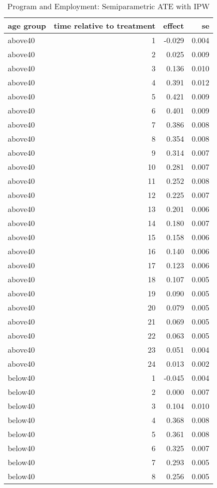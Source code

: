 \begin{table}[!h]
\centering
\caption{Program and Employment: Semiparametric ATE with IPW}
\centering
\begin{tabular}[t]{lrrr}
\toprule
age group & time relative to treatment & effect & se\\
\midrule
above40 & 1 & -0.029 & 0.004\\
above40 & 2 & 0.025 & 0.009\\
above40 & 3 & 0.136 & 0.010\\
above40 & 4 & 0.391 & 0.012\\
above40 & 5 & 0.421 & 0.009\\
\addlinespace
above40 & 6 & 0.401 & 0.009\\
above40 & 7 & 0.386 & 0.008\\
above40 & 8 & 0.354 & 0.008\\
above40 & 9 & 0.314 & 0.007\\
above40 & 10 & 0.281 & 0.007\\
\addlinespace
above40 & 11 & 0.252 & 0.008\\
above40 & 12 & 0.225 & 0.007\\
above40 & 13 & 0.201 & 0.006\\
above40 & 14 & 0.180 & 0.007\\
above40 & 15 & 0.158 & 0.006\\
\addlinespace
above40 & 16 & 0.140 & 0.006\\
above40 & 17 & 0.123 & 0.006\\
above40 & 18 & 0.107 & 0.005\\
above40 & 19 & 0.090 & 0.005\\
above40 & 20 & 0.079 & 0.005\\
\addlinespace
above40 & 21 & 0.069 & 0.005\\
above40 & 22 & 0.063 & 0.005\\
above40 & 23 & 0.051 & 0.004\\
above40 & 24 & 0.013 & 0.002\\
below40 & 1 & -0.045 & 0.004\\
\addlinespace
below40 & 2 & 0.000 & 0.007\\
below40 & 3 & 0.104 & 0.010\\
below40 & 4 & 0.368 & 0.008\\
below40 & 5 & 0.361 & 0.008\\
below40 & 6 & 0.325 & 0.007\\
\addlinespace
below40 & 7 & 0.293 & 0.005\\
below40 & 8 & 0.256 & 0.005\\

\end{tabular}
\end{table}
